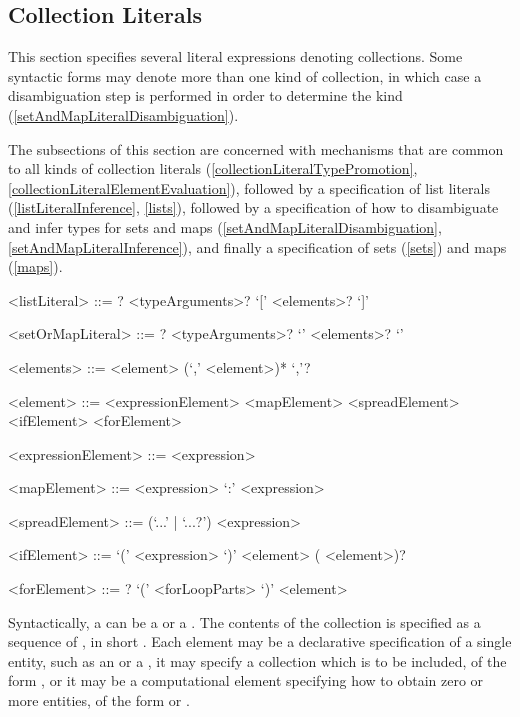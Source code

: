 \documentclass[makeidx]{article}
\begin{document}
{\subsection{Collection Literals}

\LMHash{}%
This section specifies several literal expressions denoting collections.
Some syntactic forms may denote more than one kind of collection,
in which case a disambiguation step is performed
in order to determine the kind
(\ref{setAndMapLiteralDisambiguation}).

\LMHash{}%
The subsections of this section are concerned with mechanisms that are
common to all kinds of collection literals
(\ref{collectionLiteralTypePromotion},
\ref{collectionLiteralElementEvaluation}),
followed by a specification of list literals
(\ref{listLiteralInference}, \ref{lists}),
followed by a specification of how to disambiguate and infer types
for sets and maps
(\ref{setAndMapLiteralDisambiguation}, \ref{setAndMapLiteralInference}),
and finally a specification of sets
(\ref{sets})
and maps
(\ref{maps}).

\begin{grammar}
<listLiteral> ::= \CONST? <typeArguments>? `[' <elements>? `]'

<setOrMapLiteral> ::= \CONST? <typeArguments>? `{' <elements>? `}'

<elements> ::= <element> (`,' <element>)* `,'?

<element> ::= <expressionElement>
  \alt <mapElement>
  \alt <spreadElement>
  \alt <ifElement>
  \alt <forElement>

<expressionElement> ::= <expression>

<mapElement> ::= <expression> `:' <expression>

<spreadElement> ::= (`...' | `...?') <expression>

<ifElement> ::= \IF{} `(' <expression> `)' <element> (\ELSE{} <element>)?

<forElement> ::= \AWAIT? \FOR{} `(' <forLoopParts> `)' <element>
\end{grammar}

\LMHash{}%
Syntactically, a  can be
a  or a .
The contents of the collection is specified as a sequence of
,
in short .
Each element may be a declarative specification of a single entity,
such as an  or a ,
it may specify a collection which is to be included,
of the form ,
or it may be a computational element specifying
how to obtain zero or more entities,
of the form  or .

}
\end{document}
